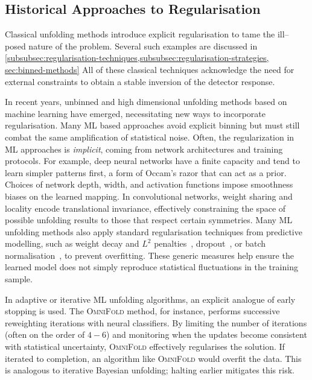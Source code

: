 {{    \subsection{Historical Approaches to Regularisation}
        Classical unfolding methods introduce explicit regularisation to tame the ill--posed nature of the problem.
        Several such examples are discussed in \cref{subsubsec:regularisation-techniques,subsubsec:regularisation-strategies, sec:binned-methods}
        All of these classical techniques acknowledge the need for external constraints to obtain a stable inversion of the detector response.

        In recent years, unbinned and high dimensional unfolding methods based on machine learning have emerged, necessitating new ways to incorporate regularisation.
        Many ML based approaches avoid explicit binning but must still combat the same amplification of statistical noise.
        Often, the regularization in ML approaches is \emph{implicit}, coming from network architectures and training protocols.
        For example, deep neural networks have a finite capacity and tend to learn simpler patterns first, a form of Occam’s razor that can act as a prior.
        Choices of network depth, width, and activation functions impose smoothness biases on the learned mapping.
        In convolutional networks, weight sharing and locality encode translational invariance, effectively constraining the space of possible unfolding results to those that respect certain symmetries.
        Many ML unfolding methods also apply standard regularisation techniques from predictive modelling, such as weight decay and $L^2$ penalties~\cite{dangelo_why_2024}, dropout~\cite{srivastava_dropout_2014}, or batch normalisation~\cite{Ioffe2015BatchShift}, to prevent overfitting.
        These generic measures help ensure the learned model does not simply reproduce statistical fluctuations in the training sample.

        In adaptive or iterative ML unfolding algorithms, an explicit analogue of early stopping is used.
        The \textsc{OmniFold} method, for instance, performs successive reweighting iterations with neural classifiers.
        By limiting the number of iterations (often on the order of \(4-6\)) and monitoring when the updates become consistent with statistical uncertainty, \textsc{OmniFold} effectively regularises the solution.
        If iterated to completion, an algorithm like \textsc{OmniFold} would overfit the data.
        This is analogous to iterative Bayesian unfolding; halting earlier mitigates this risk.
        
}}
